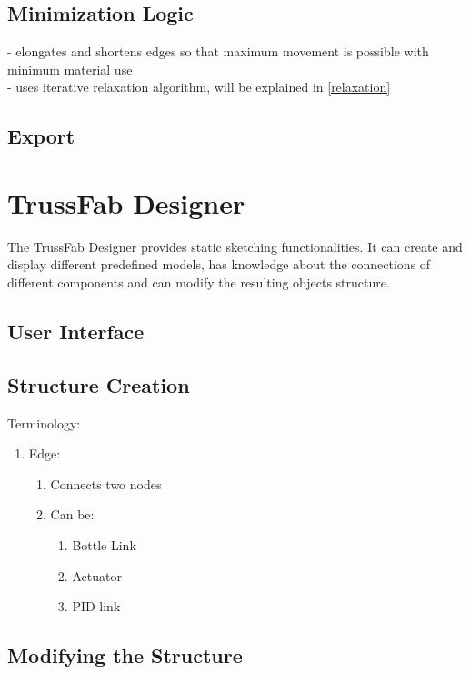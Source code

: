 \subsection{Minimization Logic}
- elongates and shortens edges so that maximum movement is possible with minimum material use\\
- uses iterative relaxation algorithm, will be explained in \ref{relaxation}

\subsection{Export}

\section{TrussFab Designer}
The TrussFab Designer provides static sketching functionalities. It can create and display different predefined models, has knowledge about the connections of different components and can modify the resulting objects structure.

\subsection{User Interface}

\subsection{Structure Creation}
Terminology:\\
\begin{enumerate}
    \item Edge:
    \begin{enumerate}
        \item Connects two nodes
        \item Can be:
        \begin{enumerate}
            \item Bottle Link
            \item Actuator
            \item PID link
        \end{enumerate}
    \end{enumerate}
\end{enumerate}

\subsection{Modifying the Structure}

